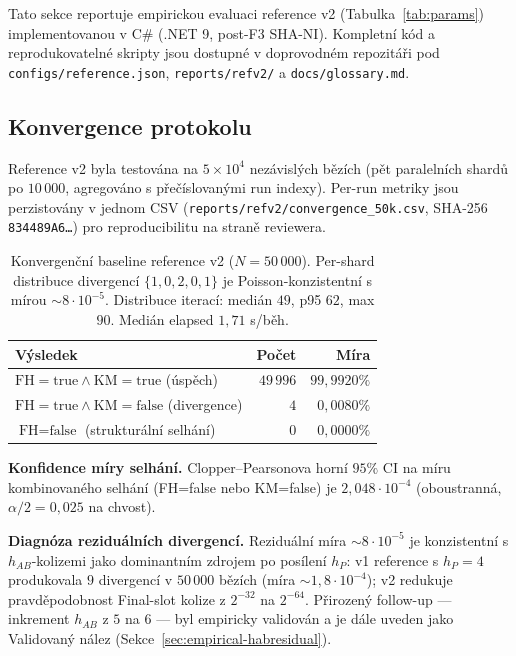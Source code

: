 \documentclass[11pt,a4paper]{article}
\begin{document}
Tato sekce reportuje empirickou evaluaci reference v2 (Tabulka~\ref{tab:params}) implementovanou v C\# (.NET 9, post-F3 SHA-NI). Kompletní kód a reprodukovatelné skripty jsou dostupné v doprovodném repozitáři pod \texttt{configs/reference.json}, \texttt{reports/refv2/} a \texttt{docs/glossary.md}.

\subsection{Konvergence protokolu}\label{sec:empirical-convergence}

Reference v2 byla testována na $5 \times 10^4$ nezávislých bězích (pět paralelních shardů po $10\,000$, agregováno s přečíslovanými run indexy). Per-run metriky jsou perzistovány v jednom CSV (\texttt{reports/refv2/convergence\_50k.csv}, SHA-256 \texttt{834489A6\ldots}) pro reproducibilitu na straně reviewera.

\begin{table}[ht]
\centering
\small
\begin{tabular}{lrr}
\toprule
Výsledek & Počet & Míra \\
\midrule
$\text{FH}=\text{true} \land \text{KM}=\text{true}$ (úspěch) & $49\,996$ & $99{,}9920\%$ \\
$\text{FH}=\text{true} \land \text{KM}=\text{false}$ (divergence) & $4$ & $0{,}0080\%$ \\
$\text{FH}=\text{false}$ (strukturální selhání) & $0$ & $0{,}0000\%$ \\
\bottomrule
\end{tabular}
\caption{Konvergenční baseline reference v2 ($N = 50\,000$). Per-shard distribuce divergencí $\{1, 0, 2, 0, 1\}$ je Poisson-konzistentní s mírou $\sim 8 \cdot 10^{-5}$. Distribuce iterací: medián $49$, p95 $62$, max $90$. Medián elapsed $1{,}71$ s/běh.}
\label{tab:f2-v2}
\end{table}

\textbf{Konfidence míry selhání.} Clopper--Pearsonova horní $95\%$ CI na míru kombinovaného selhání (FH=false nebo KM=false) je $2{,}048 \cdot 10^{-4}$ (oboustranná, $\alpha/2 = 0{,}025$ na chvost).

\textbf{Diagnóza reziduálních divergencí.} Reziduální míra $\sim 8 \cdot 10^{-5}$ je konzistentní s $h_{AB}$-kolizemi jako dominantním zdrojem po posílení $h_P$: v1 reference s $h_P = 4$ produkovala $9$ divergencí v $50\,000$ bězích (míra $\sim 1{,}8 \cdot 10^{-4}$); v2 redukuje pravděpodobnost Final-slot kolize z $2^{-32}$ na $2^{-64}$. Přirozený follow-up — inkrement $h_{AB}$ z $5$ na $6$ — byl empiricky validován a je dále uveden jako Validovaný nález (Sekce~\ref{sec:empirical-habresidual}).
\end{document}

